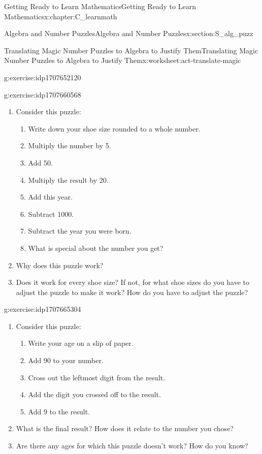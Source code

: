 \documentclass[oneside,10pt,]{book}
\numberwithin{equation}{chapter}
\begin{document}
\begin{chapterptx}{Getting Ready to Learn Mathematics}{}{Getting Ready to Learn Mathematics}{}{}{x:chapter:C_learnmath}
\begin{sectionptx}{Algebra and Number Puzzles}{}{Algebra and Number Puzzles}{}{}{x:section:S_alg_puzz}
\begin{worksheet-subsection}{Translating Magic Number Puzzles to Algebra to Justify Them}{}{Translating Magic Number Puzzles to Algebra to Justify Them}{}{}{x:worksheet:act-translate-magic}
\begin{divisionexercise}{1}{}{}{g:exercise:idp1707652120}
\begin{enumerate}[font=\bfseries,label=(\alph*),ref=\alph*]
\end{enumerate}
\end{divisionexercise}%
\begin{divisionexercise}{2}{}{}{g:exercise:idp1707660568}%
\begin{enumerate}[font=\bfseries,label=(\alph*),ref=\alph*]
\item{}Consider this puzzle:%
\begin{enumerate}[label=(\alph*)]
\item{}Write down your shoe size rounded to a whole number.%
\item{}Multiply the number by 5.%
\item{}Add 50.%
\item{}Multiply the result by 20.%
\item{}Add this year.%
\item{}Subtract 1000.%
\item{}Subtract the year you were born.%
\item{}What is special about the number you get?%
\end{enumerate}
%
\item{}Why does this puzzle work?%
\item{}Does it work for every shoe size? If not, for what shoe sizes do you have to adjust the puzzle to make it work? How do you have to adjust the puzzle?%
\end{enumerate}
\end{divisionexercise}%
\begin{divisionexercise}{3}{}{}{g:exercise:idp1707665304}%
\begin{enumerate}[font=\bfseries,label=(\alph*),ref=\alph*]
\item{}Consider this puzzle:%
\begin{enumerate}[label=(\alph*)]
\item{}Write your age on a slip of paper.%
\item{}Add 90 to your number.%
\item{}Cross out the leftmost digit from the result.%
\item{}Add the digit you crossed off to the result.%
\item{}Add 9 to the result.%
\end{enumerate}
%
\item{}What is the final result? How does it relate to the number you chose?%
\item{}Are there any ages for which this puzzle doesn't work? How do you know?%
\end{enumerate}

\end{divisionexercise}
\end{worksheet-subsection}
\end{sectionptx}
\end{chapterptx}
\end{document}

